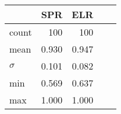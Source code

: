 \begin{tabular}{ l r r r r }
\toprule
         &  SPR   &  ELR   \\
\midrule
count	 &    100 &   100  \\
mean     &  0.930 & 0.947  \\
$\sigma$ &  0.101 &  0.082 \\
min      &  0.569 & 0.637  \\
max      &  1.000 & 1.000  \\
\bottomrule
\end{tabular}
